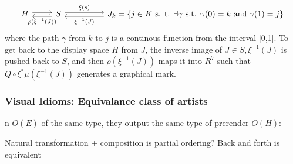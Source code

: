 \documentclass[../main.tex]{subfiles}
\begin{document}
\begin{equation}
    \begin{tikzcd}
        H \arrow[r, shift left] & S \arrow[l, "\rho(\xi^{-1}(J))", shift left] \arrow[rr, "\xi(s)", shift left] &  & J_{k} =  \{j \in K \text{ s. t. } \exists \gamma \text{ s.t. } \gamma(0)=k \text{ and }\gamma(1)=j\} \arrow[ll, "\xi^{-1}(J)", shift left]
    \end{tikzcd}
    \label{eq:mark}
\end{equation}
where the path\cite{ConnectedSpace2020}  $\gamma$ from $k$ to $j$ is a continous function from the interval [0,1]. To get back to the display space $H$ from $J$, the inverse image of $J \in S, \xi^{-1}(J)$ is pushed back to $S$, and then $\rho(\xi^{-1}(J))$ maps it into $R^{7}$ such that $Q\circ\xi^*\mu(\xi^{-1}(J))$ generates a graphical mark.

\subsubsection{Visual Idioms: Equivalance class of artists}
n $O(E)$ of the same type, they output the same type of prerender $O(H)$:


Natural transformation + composition is partial ordering? Back and forth is equivalent 
\end{document}
